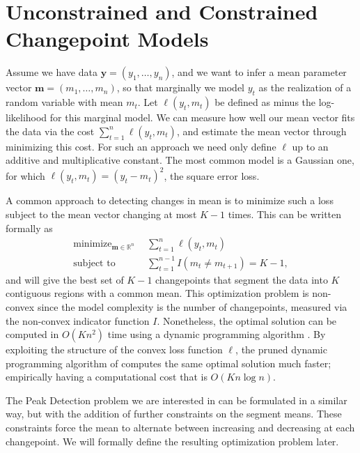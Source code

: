 \documentclass[aoas]{imsart}
\DeclareMathOperator*{\minimize}{minimize}
\newcommand{\RR}{\mathbb R}
\begin{document}
\section{Unconstrained and Constrained Changepoint Models}
\label{sec:models}

Assume we have data $\mathbf y=(y_1,\ldots,y_n)$, and we want to infer
a mean parameter vector $\mathbf m=(m_1,\ldots,m_n)$, so that marginally
we model $y_t$ as the realization of a random variable with mean $m_t$. 
Let $\ell(y_t,m_t)$ be defined as minus the log-likelihood for this marginal model.
We can measure how well our mean vector fits the data via the cost
$\sum_{t=1}^n \ell(y_t,m_t)$, and estimate the mean vector through minimizing this cost.
For such an approach we need only define $\ell$ up to an additive and multiplicative constant. The
most common model is a Gaussian one, for which $\ell(y_t,m_t)=(y_t-m_t)^2$, the square error loss.

A common approach to detecting changes in mean is to minimize such a loss 
subject to the mean vector changing at most $K-1$ times. This can be written formally
as
\begin{align}
  \label{eq:optimal_segment_neighborhood}
  \minimize_{\mathbf m\in\RR^n} &\ \ 
  \sum_{t=1}^n \ell(y_t, m_t)\\
  \text{subject to} &\ \  \sum_{t=1}^{n-1} I(m_t \neq m_{t+1}) = K-1,
  \nonumber
\end{align}
and will give the best set of $K-1$ changepoints that segment the data into $K$
contiguous regions with a common mean.  This optimization problem is non-convex since the model complexity is
the number of changepoints, measured via the non-convex indicator
function $I$. Nonetheless, the optimal solution can be computed in
$O(K n^2)$ time using a dynamic programming algorithm
\citep{segment-neighborhood}. By exploiting the structure of the
convex loss function $\ell$, the pruned dynamic programming algorithm
of \citet{pruned-dp} computes the same optimal solution much faster; empirically
having a computational cost that is
$O(K n \log n)$.

The Peak Detection problem we are interested in can be formulated in a similar way, but with
the addition of further constraints on the segment means. These constraints force the mean
to alternate between increasing and decreasing at each changepoint. We will formally define the resulting
optimization problem later.
\end{document}
